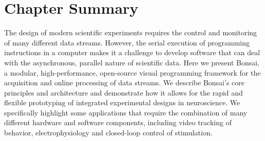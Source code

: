 				
\section{Chapter Summary}

The design of modern scientific experiments requires the control and monitoring of many different data streams. However, the serial execution of programming instructions in a computer makes it a challenge to develop software that can deal with the asynchronous, parallel nature of scientific data. Here we present Bonsai, a modular, high-performance, open-source visual programming framework for the acquisition and online processing of data streams. We describe Bonsai's core principles and architecture and demonstrate how it allows for the rapid and flexible prototyping of integrated experimental designs in neuroscience. We specifically highlight some applications that require the combination of many different hardware and software components, including video tracking of behavior, electrophysiology and closed-loop control of stimulation.

\pagebreak


